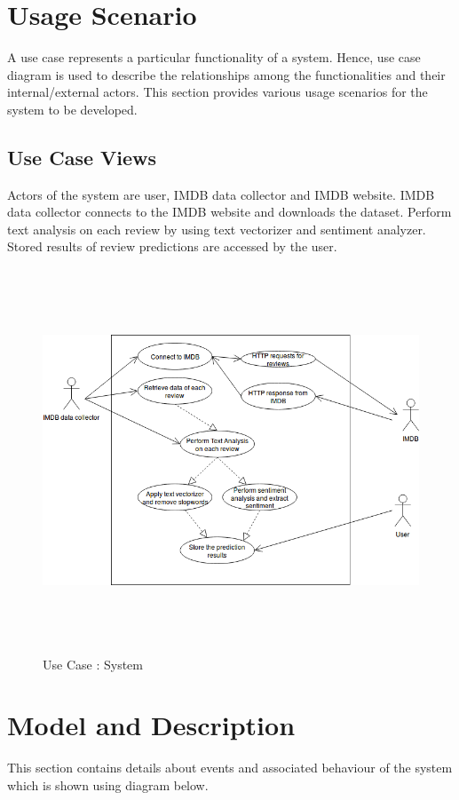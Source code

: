 \documentclass[oneside,a4paper,12pt]{pictreport}
\begin{document}
\section{Usage Scenario}
A use case represents a particular functionality of a system. Hence, use case diagram is used to describe the relationships among the functionalities and their internal/external actors. This section provides various usage scenarios for the system to be developed.


\newpage
\subsection{Use Case Views}
Actors of the system are user, IMDB data collector and IMDB website.
IMDB data collector connects to the IMDB website and downloads the dataset.
Perform text analysis on each review by using text vectorizer and sentiment 
analyzer. Stored results of review predictions are accessed by the user.



\vspace{5mm}

\begin{figure}[h!]
\includegraphics[width=5.2in,height=4.5in]{usecase2.png}
\caption{Use Case : System}
\end{figure}
\newpage
\section{Model and Description}
This section contains details about events and associated behaviour of the system which is shown using diagram below.
\end{document}
